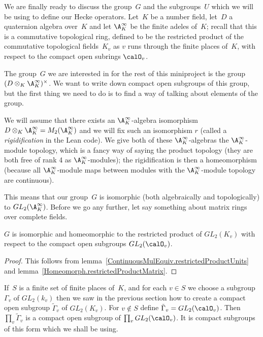 We are finally ready to discuss the group~$G$ and the subgroups~$U$ which we will be
using to define our Hecke operators. Let~$K$ be a number field, let~$D$ a quaternion algebra
over~$K$ and let $\A_K^\infty$ be the finite adeles of~$K$; recall that this is a commutative
topological ring, defined to be the restricted
product of the commutative topological fields~$K_v$ as $v$ runs through the finite places
of~$K$, with respect to the compact open subrings $\calO_v$.

The group~$G$ we are interested in for the rest of this miniproject is the group
$(D\otimes_K\A_K^\infty)^\times$. We want to write down compact open subgroups of this group,
but the first thing we need to do is to find a way of talking about elements of the group.

We will assume that there exists an $\A_K^\infty$-algebra isomorphism
$D\otimes_K\A_K^\infty=M_2(\A_K^\infty)$ and we will fix such an isomorphism $r$
(called a \emph{rigidification} in the Lean code). We give both of these $\A_K^\infty$-algebras
the $\A_K^\infty$-module topology, which is a fancy way of saying the product topology
(they are both free of rank 4 as $\A_K^\infty$-modules); the rigidification is then
a homeomorphism (because all $\A_K^\infty$-module maps between modules with the $\A_K^\infty$-module
topology are continuous).

This means that our group~$G$ is isomorphic (both algebraically and topologically)
to $GL_2(\A_K^\infty)$. Before we go any further,
let say something about matrix rings over complete fields.

\begin{theorem}
  \label{GL2.restrictedProduct}
  \leanok
  $G$ is isomorphic and homeomorphic
  to the restricted product of $GL_2(K_v)$ with respect
  to the compact open subgroups $GL_2(\calO_v)$.
\end{theorem}
\begin{proof}
  \leanok
  This follows from lemma~\ref{ContinuousMulEquiv.restrictedProductUnits}
  and lemma~\ref{Homeomorph.restrictedProductMatrix}.
\end{proof}

If~$S$ is a finite set of finite places of~$K$, and for each $v\in S$ we choose
a subgroup $\Gamma_v$ of $GL_2(k_v)$ then we saw in the previous section how to
create a compact open subgroup $\tilde{\Gamma}_v$ of $GL_2(K_v)$. For $v\notin S$
define $\tilde{\Gamma}_v=GL_2(\calO_v)$. Then $\prod_v\tilde{\Gamma}_v$ is a compact
open subgroup of $\prod_vGL_2(\calO_v)$. It is compact subgroups of this form
which we shall be using.

